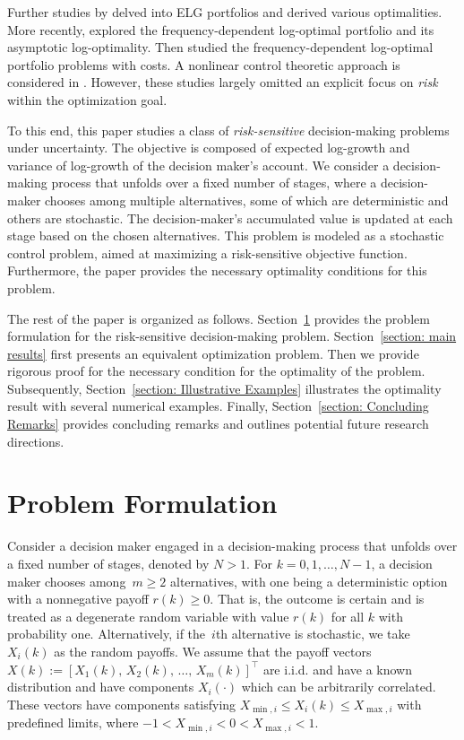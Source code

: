 \documentclass[letterpaper, 10 pt, journal, twoside]{IEEEtran}  %
\begin{document}
Further studies by \cite{algoet1988asymptotic, cover2006elements} delved into ELG portfolios and derived various optimalities. More recently, \cite{hsieh2020necessary, hsieh2023asymptotic} explored the frequency-dependent log-optimal portfolio and its asymptotic log-optimality. Then
\cite{wong2023frequency} studied the frequency-dependent log-optimal portfolio problems with costs. A nonlinear control theoretic approach is considered in \cite{proskurnikov2023benefit}.
However, these studies largely omitted an explicit focus on \textit{risk} within the optimization goal.


To this end, this paper studies a class of \textit{risk-sensitive} decision-making problems under uncertainty. The objective is composed of expected log-growth and variance of log-growth of the decision maker's account.
We consider a decision-making process that unfolds over a fixed number of stages, where a decision-maker chooses among multiple alternatives, some of which are deterministic and others are stochastic. The decision-maker's accumulated value is updated at each stage based on the chosen alternatives. This problem is modeled as a stochastic control problem, aimed at maximizing a risk-sensitive objective function. 
Furthermore, the paper provides the necessary optimality conditions for this problem.




 The rest of the paper is organized as follows. Section~\ref{section: problem formulation} provides the problem formulation for the risk-sensitive decision-making problem. Section~\ref{section: main results} first presents an equivalent optimization problem.
Then we provide rigorous proof for the necessary condition for the optimality of the problem. Subsequently, Section~\ref{section: Illustrative Examples} illustrates the optimality result with several numerical examples. Finally, Section~\ref{section: Concluding Remarks} provides concluding remarks and outlines potential future research directions.


 
	
 
\section{Problem Formulation}\label{section: problem formulation}	
Consider a decision maker engaged in a decision-making process that unfolds over a fixed number of stages, denoted by $N>1$. 
For $k=0,1,\dots, N-1$, a decision maker chooses among~$m \geq 2$ alternatives, with one being a deterministic option with a nonnegative payoff $r(k) \geq 0.$ That is, the outcome is certain and is treated as a degenerate random variable with value $r(k)$ for all $k$ with probability one. 
Alternatively, if the~$i$th alternative is stochastic, we take~$X_i(k)$ as the random payoffs.
We assume that the payoff vectors~$
X(k):=\left[ X_1(k), \, X_2(k),\,  \dots, \,X_m(k) \right]^\top 
$
are i.i.d. and have a known distribution and have components $X_i(\cdot)$ which can be arbitrarily correlated. 
These vectors have components satisfying
$
X_{\min,i}  \leq X_i(k) \leq X_{\max,i}
$
with predefined limits, where $-1 < X_{\min,i} < 0 < X_{\max,i} < 1$.
\end{document}
